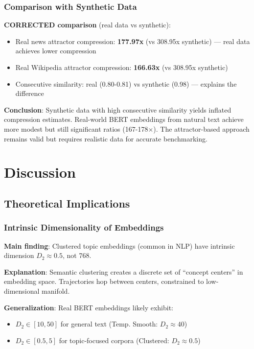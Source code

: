 \documentclass[11pt,a4paper]{article}
\begin{document}
\subsubsection{Comparison with Synthetic Data}

\textbf{CORRECTED comparison} (real data vs synthetic):
\begin{itemize}
\item Real news attractor compression: \textbf{177.97x} (vs 308.95x synthetic) --- real data achieves lower compression
\item Real Wikipedia attractor compression: \textbf{166.63x} (vs 308.95x synthetic)
\item Consecutive similarity: real (0.80-0.81) vs synthetic (0.98) --- explains the difference
\end{itemize}

\textbf{Conclusion}: Synthetic data with high consecutive similarity yields inflated compression estimates. Real-world BERT embeddings from natural text achieve more modest but still significant ratios (167-178$\times$). The attractor-based approach remains valid but requires realistic data for accurate benchmarking.

\section{Discussion}

\subsection{Theoretical Implications}

\subsubsection{Intrinsic Dimensionality of Embeddings}

\textbf{Main finding}: Clustered topic embeddings (common in NLP) have intrinsic dimension $D_2 \approx 0.5$, not 768.

\textbf{Explanation}: Semantic clustering creates a discrete set of ``concept centers'' in embedding space. Trajectories hop between centers, constrained to low-dimensional manifold.

\textbf{Generalization}: Real BERT embeddings likely exhibit:
\begin{itemize}
\item $D_2 \in [10, 50]$ for general text (Temp. Smooth: $D_2 \approx 40$)
\item $D_2 \in [0.5, 5]$ for topic-focused corpora (Clustered: $D_2 \approx 0.5$)
\end{itemize}
\end{document}
